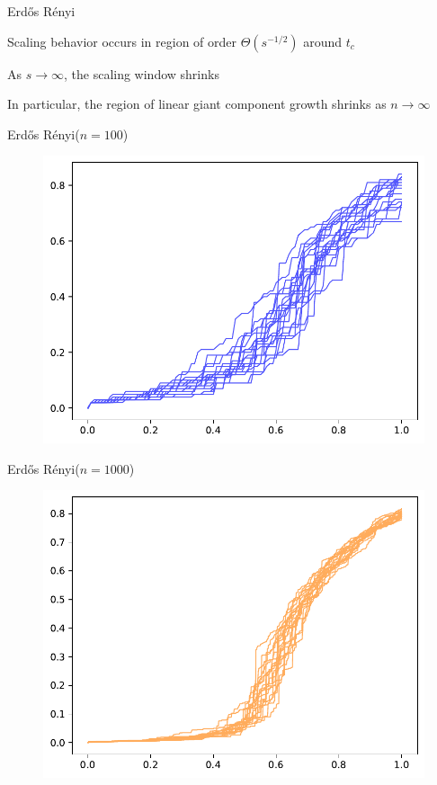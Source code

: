 \documentclass{beamer}
\newcommand{\ER}{Erd\H{o}s R\'enyi\xspace}
\newcommand{\nl}{
\vspace{5mm}

}
\begin{document}
\begin{frame}{\ER}
	
	Scaling behavior occurs in region of order $\Theta(s^{-1/2})$ around $t_{c}$ \nl

	As $s \to \infty$, the scaling window shrinks \nl

	In particular, the region of linear giant component growth shrinks as $n \to \infty$

\end{frame}

\begin{frame}{\ER ($n =100$)}

        \begin{figure}[H]
                \centering
                \includegraphics[scale=0.7]{fig/100.pdf}
        \end{figure}
\end{frame}
\begin{frame}{\ER ($n =1000$)}

        \begin{figure}[H]
                \centering
                \includegraphics[scale=0.7]{fig/1000.pdf}
        \end{figure}
\end{frame}
\end{document}

